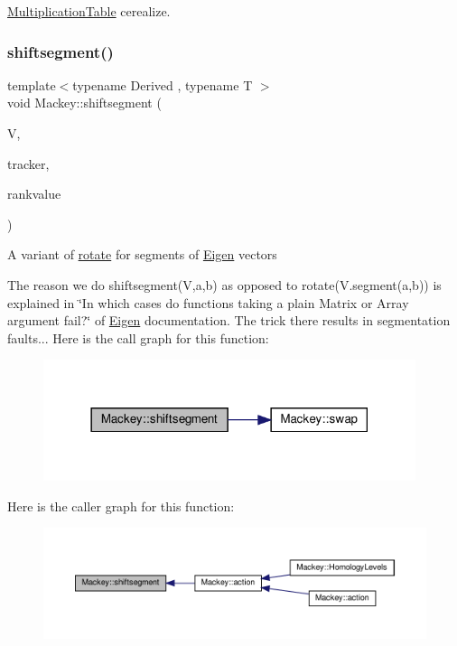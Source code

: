 \hyperlink{classMackey_1_1MultiplicationTable}{Multiplication\+Table} cerealize. 

\mbox{\label{namespaceMackey_aab8a6292210a3b71960cb03b79d218e6}} 
\subsubsection{\texorpdfstring{shiftsegment()}{shiftsegment()}}
{\footnotesize\ttfamily template$<$typename Derived , typename T $>$ \\
void Mackey\+::shiftsegment (\begin{DoxyParamCaption}\item[{Eigen\+::\+Matrix\+Base$<$ Derived $>$ \&}]{V,  }\item[{int}]{tracker,  }\item[{T}]{rankvalue }\end{DoxyParamCaption})}

A variant of \hyperlink{namespaceMackey_a38a833de54971845cbdb8c96f830725b}{rotate} for segments of \hyperlink{namespaceEigen}{Eigen} vectors

The reason we do shiftsegment(\+V,a,b) as opposed to rotate(V.\+segment(a,b)) is explained in \char`\"{}\+In which cases do functions taking a plain Matrix or Array argument fail?\char`\"{} of \hyperlink{namespaceEigen}{Eigen} documentation. The trick there results in segmentation faults... Here is the call graph for this function\+:\nopagebreak
\begin{figure}[H]
\begin{center}
\leavevmode
\includegraphics[width=309pt]{namespaceMackey_aab8a6292210a3b71960cb03b79d218e6_cgraph}
\end{center}
\end{figure}
Here is the caller graph for this function\+:\nopagebreak
\begin{figure}[H]
\begin{center}
\leavevmode
\includegraphics[width=350pt]{namespaceMackey_aab8a6292210a3b71960cb03b79d218e6_icgraph}
\end{center}
\end{figure}
\mbox{\label{namespaceMackey_a1b3e66989e89c8b97d113d8eec0b47b8}} 
